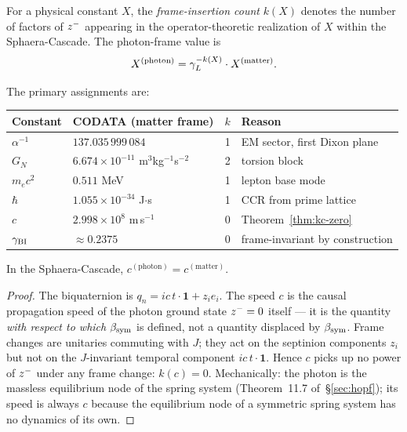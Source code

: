 \begin{definition}
For a physical constant $X$, the \emph{frame-insertion count} $k(X)$ denotes
 the number of factors of $z^-$ appearing in the operator-theoretic
 realization of $X$ within the Sphaera-Cascade.
The photon-frame value is
\[
  X^{(\mathrm{photon})} = \gamma_L^{-k(X)}\cdot X^{(\mathrm{matter})}.
\]
\end{definition}

\begin{theorem}\label{thm:k-values}
The primary assignments are:
\begin{center}
\renewcommand{\arraystretch}{1.3}
\begin{tabular}{llcl}
\toprule
Constant & CODATA (matter frame) & $k$ & Reason\\
\midrule
$\alpha^{-1}$ & $137.035\,999\,084$ & 1
  & EM sector, first Dixon plane\\
$G_N$ & $6.674\times10^{-11}$ m$^3$kg$^{-1}$s$^{-2}$ & 2
  & torsion block\\
$m_e c^2$ & $0.511$ MeV & 1
  & lepton base mode\\
$\hbar$ & $1.055\times10^{-34}$ J$\cdot$s & 1
  & CCR from prime lattice\\
$c$ & $2.998\times10^8$ m\,s$^{-1}$ & 0
  & Theorem~\ref{thm:kc-zero}\\
$\gamma_{\mathrm{BI}}$ & $\approx 0.2375$ & 0
  & frame-invariant by construction\\
\bottomrule
\end{tabular}
\end{center}
\end{theorem}

\begin{theorem}[$k(c)=0$: the speed of light is frame-invariant]
\label{thm:kc-zero}
In the Sphaera-Cascade, $c^{(\mathrm{photon})}=c^{(\mathrm{matter})}$.
\end{theorem}

\begin{proof}
The biquaternion is $q_n = ic\,t\cdot\mathbf{1}+z_i e_i$.
The speed $c$ is the causal propagation speed of the photon ground state
$z^-=0$ itself --- it is the quantity \emph{with respect to which}
$\beta_{\mathrm{sym}}$ is defined, not a quantity displaced by $\beta_{\mathrm{sym}}$.
Frame changes are unitaries commuting with $J$; they act on the septinion
components $z_i$ but not on the $J$-invariant temporal component
$ic\,t\cdot\mathbf{1}$.
Hence $c$ picks up no power of $z^-$ under any frame change:
$k(c)=0$.
Mechanically: the photon is the massless equilibrium node of the
spring system (Theorem~11.7 of~\S\ref{sec:hopf}); its speed is always $c$ because
the equilibrium node of a symmetric spring system has no dynamics of its own.
\end{proof}


